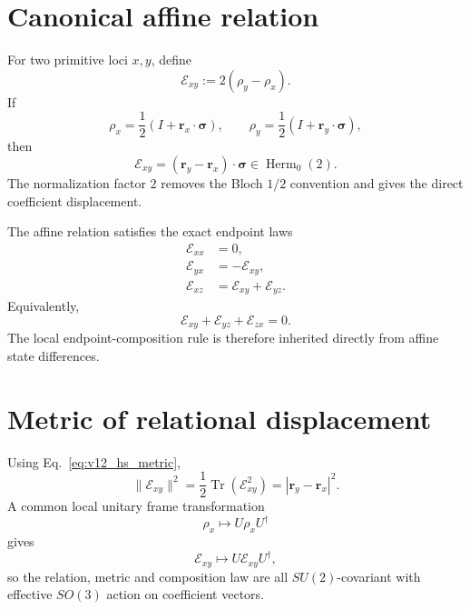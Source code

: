 \section{Canonical affine relation}

For two primitive loci $x,y$, define
\begin{equation}
\boxed{
\mathcal E_{xy}:=2(\rho_y-\rho_x).
}
\label{eq:v12_affine_relation}
\end{equation}
If
\[
\rho_x=\frac12(I+\mathbf r_x\cdot\boldsymbol\sigma),
\qquad
\rho_y=\frac12(I+\mathbf r_y\cdot\boldsymbol\sigma),
\]
then
\begin{equation}
\boxed{
\mathcal E_{xy}
=(\mathbf r_y-\mathbf r_x)\cdot\boldsymbol\sigma
\in\operatorname{Herm}_0(2).
}
\end{equation}
The normalization factor $2$ removes the Bloch $1/2$ convention and gives the direct coefficient displacement.

The affine relation satisfies the exact endpoint laws
\begin{align}
\mathcal E_{xx}&=0,\\
\mathcal E_{yx}&=-\mathcal E_{xy},\\
\boxed{\mathcal E_{xz}}&=\boxed{\mathcal E_{xy}+\mathcal E_{yz}}.
\label{eq:v12_endpoint_composition}
\end{align}
Equivalently,
\begin{equation}
\mathcal E_{xy}+\mathcal E_{yz}+\mathcal E_{zx}=0.
\end{equation}
The local endpoint-composition rule is therefore inherited directly from affine state differences.

\section{Metric of relational displacement}

Using Eq.~\eqref{eq:v12_hs_metric},
\begin{equation}
\boxed{
\|\mathcal E_{xy}\|^2
=\frac12\operatorname{Tr}(\mathcal E_{xy}^2)
=|\mathbf r_y-\mathbf r_x|^2.
}
\label{eq:v12_affine_relation_metric}
\end{equation}
A common local unitary frame transformation
\begin{equation}
\rho_x\mapsto U\rho_xU^\dagger
\end{equation}
gives
\begin{equation}
\mathcal E_{xy}\mapsto U\mathcal E_{xy}U^\dagger,
\end{equation}
so the relation, metric and composition law are all $SU(2)$-covariant with effective $SO(3)$ action on coefficient vectors.

